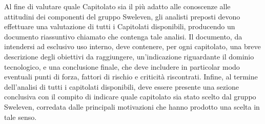Al fine di valutare quale Capitolato sia il pi\`{u} adatto alle conoscenze alle attitudini dei componenti del gruppo Sweleven, gli analisti preposti devono effettuare una valutazione di tutti i Capitolati disponibili, producendo un documento riassuntivo chiamato \SdFv{} che contenga tale analisi. Il documento, da intendersi ad esclusivo uso interno, deve contenere, per ogni capitolato, una breve descrizione degli obiettivi da raggiungere, un'indicazione riguardante il dominio tecnologico, e una conclusione finale, che deve includere in particolar modo eventuali punti di forza, fattori di rischio e criticit\`{a} riscontrati. Infine, al termine dell'analisi di tutti i capitolati disponibili, deve essere presente una sezione conclusiva con il compito di indicare quale capitolato sia stato scelto dal gruppo Sweleven, corredata dalle principali motivazioni che hanno prodotto una scelta in tale senso.